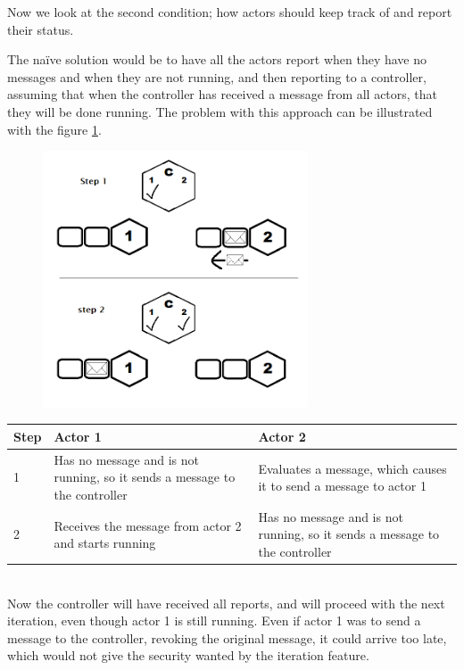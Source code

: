 Now we look at the second condition; how actors should keep track of and report their status.

The naïve solution would be to have all the actors report when they have no messages and when they are not running, and then reporting to a controller, assuming that when the controller has received a message from all actors, that they will be done running. The problem with this approach can be illustrated with the figure \cref{iterationproblem_img}. 

\begin{figure}[htbp]
\centering
\includegraphics[width=0.7\textwidth]{Analysis/Supercomputing/iterationproblem.png}\label{iterationproblem_img}
\end{figure}

\begin{tabular}{ | p{1cm} | p{6cm} | p{6cm} | }%
\hline
Step & Actor 1 & Actor 2 \\\hline
1 & Has no message and is not running, so it sends a message to the controller & Evaluates a message, which causes it to send a message to actor 1 \\\hline
2 & Receives the message from actor 2 and starts running & Has no message and is not running, so it sends a message to the controller \\\hline
\end{tabular}\\

Now the controller will have received all reports, and will proceed with the next iteration, even though actor 1 is still running. Even if actor 1 was to send a message to the controller, revoking the original message, it could arrive too late, which would not give the security wanted by the iteration feature.

